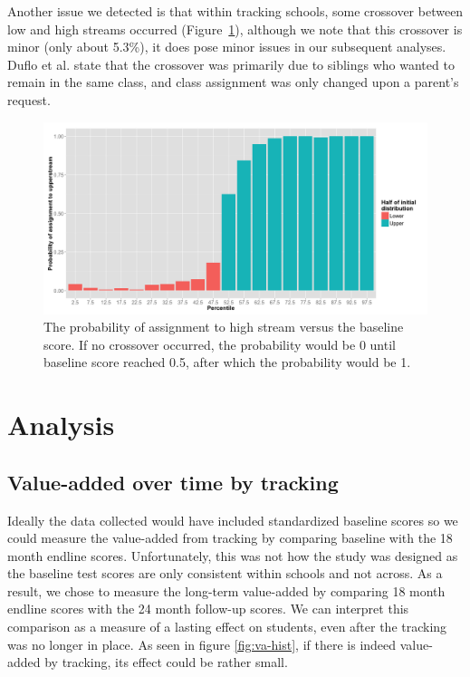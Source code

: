 \documentclass[11pt]{article}
\begin{document}
Another issue we detected is that within tracking schools, some crossover between low and high streams occurred (Figure~\ref{fig:crossover}), although we note that this crossover is minor (only about 5.3\%), it does pose minor issues in our subsequent analyses. Duflo et al. state that the crossover was primarily due to siblings who wanted to remain in the same class, and class assignment was only changed upon a parent's request.

 
 

 
  
  \begin{figure}[ht]
 \centering
 \includegraphics[scale=0.4]{tmt_assignment.png}
 \caption{The probability of assignment to high stream versus the baseline score. If no crossover occurred, the probability would be 0 until baseline score reached 0.5, after which the probability would be 1.}
 \label{fig:crossover}
 \end{figure} 
 
 
 \section{Analysis}
 \subsection{Value-added over time by tracking}
Ideally the data collected would have included standardized baseline scores so we could measure the value-added from tracking by comparing baseline with the 18 month endline scores. Unfortunately, this was not how the study was designed as the baseline test scores are only consistent within schools and not across.  As a result, we chose to measure the long-term value-added by comparing 18 month endline scores with the 24 month follow-up scores. We can interpret this comparison as a measure of a lasting effect on students, even after the tracking was no longer in place.  As seen in figure \ref{fig:va-hist}, if there is indeed value-added by tracking, its effect could be rather small.
\end{document}
